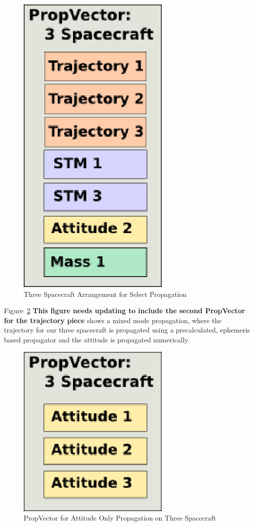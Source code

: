 \begin{figure}[htb]
\begin{center}
\includegraphics[scale=0.5]{Images/ThreeSatActivePropVector.eps}
\caption{\label{figure:SelectPropVector}Three Spacecraft Arrangement for Select
Propagation}
\end{center}
\end{figure}

Figure~\ref{figure:AttitudePropVector} \textbf{This figure needs updating to include the second
PropVector for the trajectory piece} shows a mixed mode propagation, where the trajectory for our
three spacecraft is propagated using a precalculated, ephemeris based propagator and the attitude is
propagated numerically.

\begin{figure}[htb]
\begin{center}
\includegraphics[scale=0.5]{Images/ThreeSatAttitudePropVector.eps}
\caption{\label{figure:AttitudePropVector}PropVector for Attitude Only Propagation on Three
Spacecraft}
\end{center}
\end{figure}

